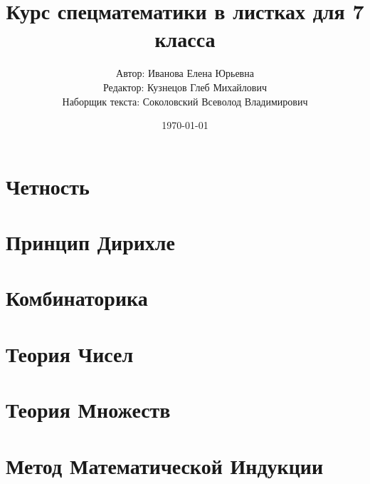 \documentclass[11pt,a4paper]{report}
\title{Курс спецматематики в листках для 7 класса}
\author{Автор: Иванова Елена Юрьевна\\
	Редактор: Кузнецов Глеб Михайлович\\
	Наборщик текста: Соколовский Всеволод Владимирович}
\date{\today}
\theoremstyle{myrmk}
\theoremstyle{mypln}
\theoremstyle{mydfn}
\theoremstyle{myques}
\begin{document}
\maketitle
\tableofcontents
\newpage

\chapter{Четность}









\chapter{Принцип Дирихле}



\chapter{Комбинаторика}




\chapter{Теория Чисел}





\chapter{Теория Множеств}




\chapter{Метод Математической Индукции}

\end{document}
